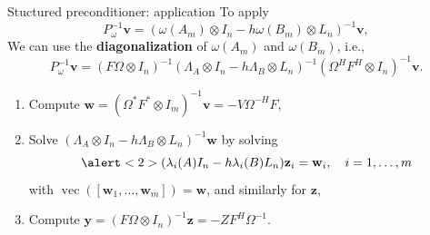 \documentclass[aspectratio=169,xcolor=dvipsnames]{beamer}
\begin{document}
\begin{frame}{Stuctured preconditioner: application}
	To apply 
	\[
	P_\omega^{-1} \mathbf{v} = (\omega(A_m)\otimes I_n - h \omega(B_m)\otimes L_n)^{-1}\mathbf{v},
	\]
	We can use the \textbf{diagonalization} of $\omega(A_m)$ and $\omega(B_m)$, i.e.,
	\[
	P_\omega^{-1} \mathbf{v} = (F\Omega \otimes I_n)^{-1} (\Lambda_A \otimes I_n - h \Lambda_B \otimes L_n)^{-1} (\Omega^{H}F^{H}\otimes I_n)^{-1} \mathbf{v}.
	\]
	\begin{enumerate}
		\item Compute $\mathbf{w} = (\Omega^{*}F^{*}\otimes I_m)^{-1} \mathbf{v} = - V \Omega^{-H}F$,
		\item Solve $(\Lambda_A \otimes I_n - h \Lambda_B \otimes L_n)^{-1} \mathbf{w}$ by solving
		\[
		\alert<2>{(\lambda_i(A) I_n - h \lambda_i(B) L_n) \mathbf{z}_i = \mathbf{w}_i, \quad i=1,\ldots,m}
		\]
		with $\operatorname{vec}([\mathbf{w}_1,\ldots,\mathbf{w}_m]) = \mathbf{w}$, and similarly for $\textbf{z}$,
		\item Compute $\mathbf{y} = (F\Omega \otimes I_n)^{-1} \mathbf{z} =  -Z F^H \Omega^{-1}$.
	\end{enumerate}

\end{frame}
\end{document}
